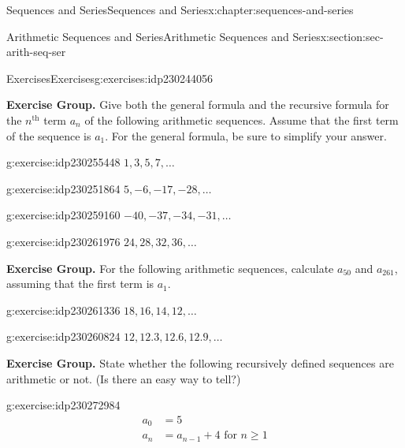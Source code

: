 \documentclass[twoside,10pt,]{book}
\numberwithin{equation}{section}
\newcommand{\nth}{{n^{\text{th}}}}
\newcommand{\amp}{&}
\begin{document}
\begin{chapterptx}{Sequences and Series}{}{Sequences and Series}{}{}{x:chapter:sequences-and-series}
\begin{sectionptx}{Arithmetic Sequences and Series}{}{Arithmetic Sequences and Series}{}{}{x:section:sec-arith-seq-ser}
\begin{exercises-subsection}{Exercises}{}{Exercises}{}{}{g:exercises:idp230244056}
\par\medskip\noindent%
\textbf{Exercise Group.}\space\space%
Give both the general formula  and the recursive formula for the \(\nth{}\) term \(a_n\) of the following arithmetic sequences.  Assume that the first term of the sequence is \(a_1\).  For the general formula, be sure to simplify your answer.\begin{exercisegroup}
\begin{divisionexerciseeg}{7}{}{}{g:exercise:idp230255448}%
\(1, 3, 5, 7, \ldots\)\end{divisionexerciseeg}%
\begin{divisionexerciseeg}{8}{}{}{g:exercise:idp230251864}%
\(5, -6, -17, -28, \ldots\)\end{divisionexerciseeg}%
\begin{divisionexerciseeg}{9}{}{}{g:exercise:idp230259160}%
\(-40, -37, -34, -31, \ldots\)\end{divisionexerciseeg}%
\begin{divisionexerciseeg}{10}{}{}{g:exercise:idp230261976}%
\(24, 28, 32, 36, \ldots\)\end{divisionexerciseeg}%
\end{exercisegroup}
\par\medskip\noindent
\par\medskip\noindent%
\textbf{Exercise Group.}\space\space%
For the following arithmetic sequences, calculate \(a_{50}\) and \(a_{261}\), assuming that the first term is \(a_1\).\begin{exercisegroup}
\begin{divisionexerciseeg}{11}{}{}{g:exercise:idp230261336}%
\(18, 16, 14, 12, \ldots\)\end{divisionexerciseeg}%
\begin{divisionexerciseeg}{12}{}{}{g:exercise:idp230260824}%
\(12, 12.3, 12.6, 12.9, \ldots\)\end{divisionexerciseeg}%
\end{exercisegroup}
\par\medskip\noindent
\par\medskip\noindent%
\textbf{Exercise Group.}\space\space%
State whether the following recursively defined sequences are arithmetic or not.  (Is there an easy way to tell?)\begin{exercisegroup}
\begin{divisionexerciseeg}{13}{}{}{g:exercise:idp230272984}%
%
\begin{align*}
a_0 \amp = 5\\
a_n\amp = a_{n-1}+4 \text{   for }n\ge 1

\end{align*}
\end{divisionexerciseeg}
\end{exercisegroup}
\end{exercises-subsection}
\end{sectionptx}
\end{chapterptx}
\end{document}
